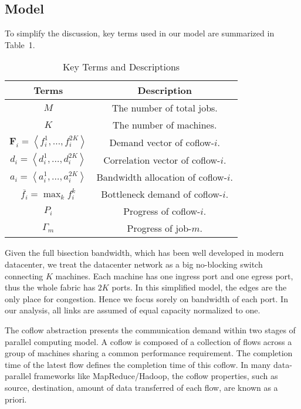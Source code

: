 \documentclass[10pt, conference, letterpaper]{IEEEtran}
\begin{document}
\subsection{Model}
To simplify the discussion, key terms used in our model are summarized in Table~1.
\begin{table}
\caption{Key Terms and Descriptions}
\begin{center}
\begin{tabular}{|c|c|}
\hline
Terms & Description\\
\hline
$M$ & The number of total jobs.\\
\hline
$K$ & The number of machines.\\
\hline
$\mathbf{F}_i = \left\langle f_i^1,\dots,f_i^{2K}\right\rangle$ & Demand vector of coflow-$i$.\\
\hline
$d_i = \left\langle d_i^1,\dots,d_i^{2K}\right\rangle$ & Correlation vector of coflow-$i$.\\
\hline
$a_i=\left\langle a_i^1,\dots,a_i^{2K}\right\rangle$ & Bandwidth allocation of coflow-$i$.\\
\hline
$\overline{f_i}=\max_{k} f_i^k$ & Bottleneck demand of coflow-$i$.\\
\hline
$P_i$ & Progress of coflow-$i$.\\
\hline
$\Gamma_m$ & Progress of job-$m$.\\
\hline
\end{tabular}
\end{center}
\end{table}

Given the full bisection bandwidth, which has been well developed in modern datacenter\cite{jupiter}, we treat the datacenter network as a big no-blocking switch connecting $K$ machines. Each machine has one ingress port and one egress port, thus the whole fabric has $2K$ ports. In this simplified model, the edges are the only place for congestion. Hence we focus sorely on bandwidth of each port. In our analysis, all links are assumed of equal capacity normalized to one.

The coflow abstraction presents the communication demand within two stages of parallel computing model. A coflow is composed of a collection of flows across a group of machines sharing a common performance requirement. The completion time of the latest flow defines the completion time of this coflow. In many data-parallel frameworks like MapReduce/Hadoop, the coflow properties, such as source, destination, amount of data transferred of each flow, are known as a priori\cite{varys, aalo, bingchuan}.
\end{document}
